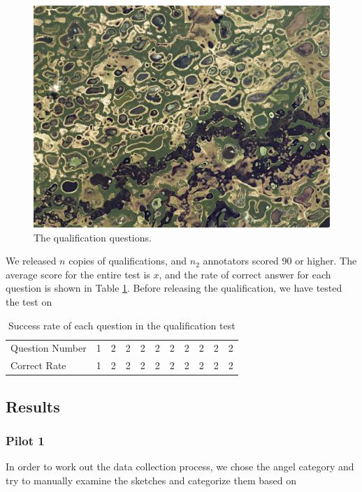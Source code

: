 \begin{figure}[h]
\includegraphics[width=.8\linewidth]{pantanal.jpeg}  
\caption{The qualification questions.}
\label{v2.qualification.1}
\end{figure}

We released $n$ copies of qualifications, and $n_2$ annotators scored $90$ or higher. The average score for the entire test is $x$, and the rate of correct answer for each question is shown in Table \ref{v2.qualification.success_rate}. Before releasing the qualification, we have tested the test on 
\begin{table}[h!]
\begin{minipage}[b]{1\textwidth}
\centering
\begin{tabular}{l|rrrrrrrrrr}
\toprule
Question Number  & 1 & 2 & 2 & 2 & 2 & 2 & 2 & 2 & 2 & 2  \\
Correct Rate  & 1 & 2 & 2 & 2 & 2 & 2 & 2 & 2 & 2 & 2\\
\bottomrule
\end{tabular}
\caption{Success rate of each question in the qualification test}
\label{v2.qualification.success_rate}
\end{minipage}
\end{table}

\subsection{Results}

\subsubsection{Pilot 1}
In order to work out the data collection process, we chose the angel category and try to manually examine the sketches and categorize them based on 


